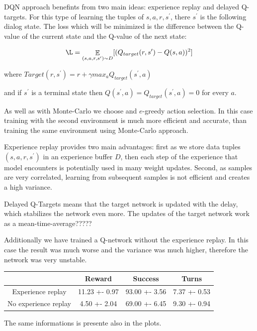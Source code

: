 \documentclass[12pt,titlepage,a4paper]{article}
\DeclareMathOperator*{\E}{\mathbb{E}}
\begin{document}
DQN approach benefints from two main ideas: experience replay and delayed Q-targets. For this type of learning the tuples of ${s, a, r, s^\prime}$, there $s^\prime$ is the following dialog state. The loss which will be minimized is the difference between the Q-value of the current state and the Q-value of the next state:

\[\L = \E_{(s, a, r, s^\prime) \sim D} [(Q_{target}(r,s^\prime) - Q(s, a))^2]\]

where $Target(r, s^\prime) = r + \gamma max_{a}Q_{target}(s^\prime,a)$

and if $s^\prime$ is a terminal state then $Q(s^\prime, a) = Q_{target}(s^\prime, a) = 0$ for every $a$.
 
As well as with Monte-Carlo we choose and $e$-greedy action selection. In this case training with the second environment is much more efficient and accurate, than training the same environment using Monte-Carlo approach. 

Experience replay provides two main advantages: first as we store data tuples $(s, a, r, s^\prime)$ in an experience buffer $D$, then each step of the experience that model encounters is potentially used in many weight updates. Second, as samples are very correlated, learning from subsequent samples is not efficient and creates a high variance.

Delayed Q-Targets means that the target network is updated with the delay, which stabilizes the network even more. The updates of the target network work as a mean-time-average?????

Additionally we have trained a Q-network without the experience replay. In this case the result was much worse and the variance was much higher, therefore the network was very unstable.

\begin{center}
    \begin{tabular}{||c c c c||} 
     \hline
      & Reward & Success & Turns \\ [0.5ex] 
     \hline\hline
     Experience replay & 11.23 +- 0.97 & 93.00 +- 3.56 & 7.37 +- 0.53 \\ 
     \hline
     No experience replay & 4.50 +- 2.04 & 69.00 +- 6.45 & 9.30 +- 0.94 \\
     \hline
    \end{tabular}
\end{center}

The same informations is presente also in the plots.
\end{document}
